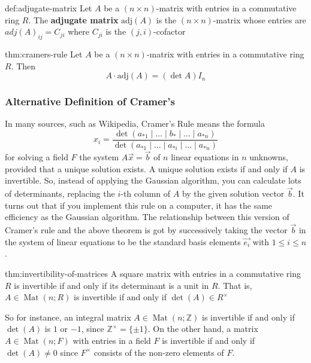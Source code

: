 \documentclass{article}
\DeclareMathOperator{\Mat}{Mat}
\begin{document}
\newpage
\begin{dfn}{def:adjugate-matrix}{}
    Let $A$ be a $(n \times n)$-matrix with entries in a commutative ring $R$. The \textbf{adjugate matrix} $\text{adj}(A)$ is the $(n \times n)$-matrix whose entries are $adj(A)_{ij} = C_{ji}$ where $C_{ji}$ is the $(j, i)$-cofactor
\end{dfn}

\begin{thm}{thm:cramers-rule}{}
    Let $A$ be a $(n \times n)$-matrix with entries in a commutative ring $R$. Then
    \[A \cdot \text{adj}(A) = (\det A)I_{n}\]
\end{thm}

\subsubsection{Alternative Definition of Cramer's}
In many sources, such as Wikipedia, Cramer's Rule means the formula
\[x_{i} = \frac{\det(a_{*1}\mid \dots \mid b_{*} \mid \dots \mid a_{*n})}{\det(a_{*1}\mid \dots \mid a_{*i} \mid \dots \mid a_{*n})}\]
for solving a field $F$ the system $A\vec{x} = \vec{b}$ of $n$ linear equations in $n$ unknowns, provided that a unique solution exists. A unique solution exists if and only if $A$ is invertible. So, instead of applying the Gaussian algorithm, you can calculate lots of determinants, replacing the $i$-th column of $A$ by the given solution vector $\vec{b}$. It turns out that if you implement this rule on a computer, it has the same efficiency as the Gaussian algorithm. The relationship between this version of Cramer's rule and the above theorem is got by successively taking the vector $\vec{b}$ in the system of linear equations to be the standard basis elements $\vec{e_{i}}$ with $1 \le i \le n$.

\begin{thm}{thm:invertibility-of-matrices}{}
    A square matrix with entries in a commutative ring $R$ is invertible if and only if its determinant is a unit in $R$. That is, $A\in \Mat(n;R)$ is invertible if and only if $\det(A)\in R^{\times}$
\end{thm}

So for instance, an integral matrix $A\in \Mat(n;\mathbb{Z})$ is invertible if and only if $\det(A)$ is $1$ or $-1$, since $\mathbb{Z}^{\times} = \{\pm 1\}$. On the other hand, a matrix $A\in \Mat(n;F)$ with entries in a field $F$ is invertible if and only if $\det(A)\ne 0$ since $F^{\times}$ consists of the non-zero elements of $F$.
\end{document}
